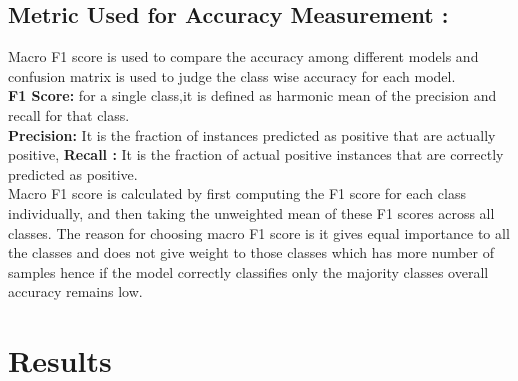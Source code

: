 \documentclass[11pt, oneside]{article}   	%
\begin{document}
\subsection{Metric Used for Accuracy Measurement :}
Macro F1 score is used to compare the accuracy among different models and confusion matrix is used to judge the class wise accuracy for each model. \\
\textbf{F1 Score:} for a single class,it is defined as harmonic mean of the precision and recall for that class. \\
\textbf{Precision:} It is the fraction of instances predicted as positive that are actually positive, 
\textbf{Recall :} It is the fraction of actual positive instances that are correctly predicted as positive.\\ Macro F1 score is calculated by first computing the F1 score for each class individually, and then taking the unweighted mean of these F1 scores across all classes.
The reason for choosing macro F1 score is it gives equal importance to all the classes and does not give weight to those classes which has more number of samples hence if the model correctly classifies only the majority classes overall accuracy remains low.

\section{Results}
\end{document}
